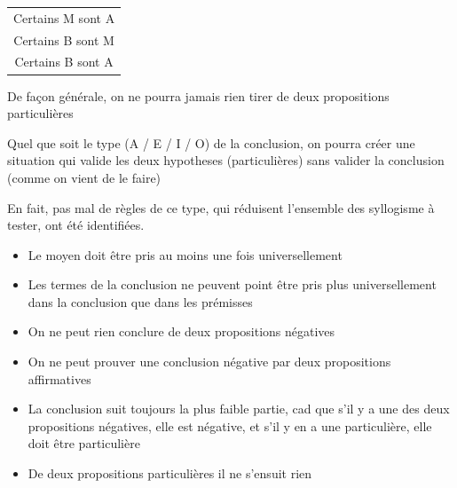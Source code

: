 \begin{frame}
	
	\begin{description}[labelindent=6pt,style=multiline,leftmargin=1.3in]
		 \setlength\itemsep{1em}

\item[Mode + figure] \begin{tabular}{c}
Certains M sont A\\ 
Certains B sont M\\ 
\cline{1-1}
Certains B sont A
\end{tabular}
	\end{description} 
De façon générale, on ne pourra jamais rien tirer de deux propositions particulières\pause \newline

Quel que soit le type (A / E / I / O) de la conclusion, on pourra créer une situation qui valide les deux hypotheses (particulières) sans valider la conclusion (comme on vient de le faire)\pause \newline

En fait, pas mal de règles de ce type, qui réduisent l'ensemble des syllogisme à tester, ont été identifiées.


\end{frame}
	


\begin{frame}
	
	\begin{itemize}
	
	\item[1] Le moyen doit être pris au moins une fois universellement\pause
	\item[2]   Les termes de la conclusion ne peuvent point être pris plus universellement dans la conclusion que dans les prémisses\pause
	\item[3]  On ne peut rien conclure de deux propositions négatives\pause
	\item[4]  On ne peut prouver une conclusion négative par deux propositions affirmatives\pause
	\item[5]  La conclusion suit toujours la plus faible partie, cad que s'il y a une des deux propositions négatives, elle est négative, et s'il y en a une particulière, elle doit être particulière\pause
	\item[6]  De deux propositions particulières il ne s'ensuit rien
	
	\end{itemize}
	
\end{frame}
	


